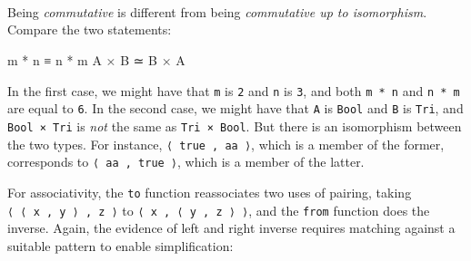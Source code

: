 \begin{fence}
\begin{code}
\AgdaSpace{}%
\AgdaOperator{\AgdaInductiveConstructor{,}}\AgdaSpace{}%
\AgdaSpace{}%
\AgdaSpace{}%
\AgdaSymbol{\}}\<%
\\
%
\>[4]\AgdaSymbol{;}\AgdaSpace{}%
%
\>[15]\AgdaSymbol{=}%
\>[18]\AgdaSpace{}%
\AgdaSpace{}%
\AgdaSpace{}%
\AgdaOperator{\AgdaInductiveConstructor{,}}\AgdaSpace{}%
\AgdaSpace{}%
\AgdaSpace{}%
\AgdaSpace{}%
\AgdaSpace{}%
\AgdaSymbol{\}}\<%
\\
%
\>[4]\AgdaSymbol{;}\AgdaSpace{}%
%
\>[15]\AgdaSymbol{=}%
\>[18]\AgdaSpace{}%
\AgdaSpace{}%
\AgdaSpace{}%
\AgdaOperator{\AgdaInductiveConstructor{,}}\AgdaSpace{}%
\AgdaSpace{}%
\AgdaSpace{}%
\AgdaSpace{}%
\AgdaSpace{}%
\AgdaSymbol{\}}\<%
\\
%
\>[4]\AgdaSymbol{\}}\<%
\end{code}
\end{fence}

Being \emph{commutative} is different from being \emph{commutative up to
isomorphism}. Compare the two statements:

\begin{myDisplay}
m * n ≡ n * m
A × B ≃ B × A
\end{myDisplay}

In the first case, we might have that \texttt{m} is \texttt{2} and
\texttt{n} is \texttt{3}, and both \texttt{m\ *\ n} and \texttt{n\ *\ m}
are equal to \texttt{6}. In the second case, we might have that
\texttt{A} is \texttt{Bool} and \texttt{B} is \texttt{Tri}, and
\texttt{Bool\ ×\ Tri} is \emph{not} the same as \texttt{Tri\ ×\ Bool}.
But there is an isomorphism between the two types. For instance,
\texttt{⟨\ true\ ,\ aa\ ⟩}, which is a member of the former, corresponds
to \texttt{⟨\ aa\ ,\ true\ ⟩}, which is a member of the latter.

For associativity, the \texttt{to} function reassociates two uses of
pairing, taking \texttt{⟨\ ⟨\ x\ ,\ y\ ⟩\ ,\ z\ ⟩} to
\texttt{⟨\ x\ ,\ ⟨\ y\ ,\ z\ ⟩\ ⟩}, and the \texttt{from} function does
the inverse. Again, the evidence of left and right inverse requires
matching against a suitable pattern to enable simplification:

